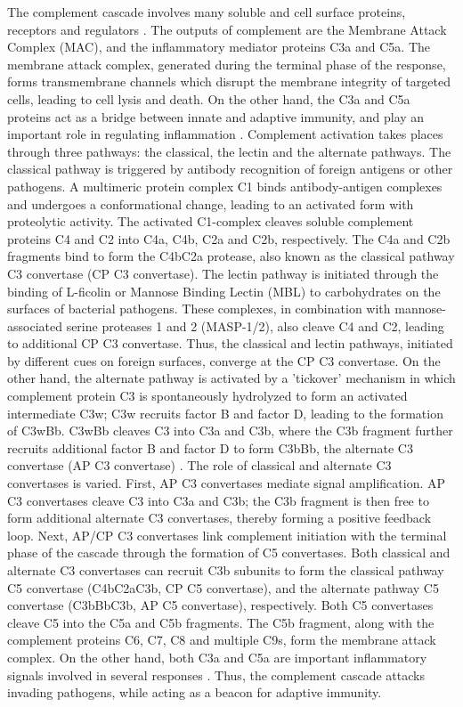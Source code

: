 \documentclass[12pt]{article}
\begin{document}
The complement cascade involves many soluble and cell surface proteins, receptors and regulators \cite{Walport:2001ab,Walport:2001aa}.
The outputs of complement are the Membrane Attack Complex (MAC), and the inflammatory mediator proteins C3a and C5a.
The membrane attack complex, generated during the terminal phase of the response,
forms transmembrane channels which disrupt the membrane integrity of targeted cells, leading to cell lysis and death.
On the other hand, the C3a and C5a proteins act as a bridge between innate and adaptive immunity, and play an important role in regulating inflammation \cite{sarma2011complement}.
Complement activation takes places through three pathways: the classical, the lectin and the alternate pathways.
The classical pathway is triggered by antibody recognition of foreign antigens or other pathogens.
A multimeric protein complex C1 binds antibody-antigen complexes and undergoes a conformational change, leading to an activated form with proteolytic activity.
The activated C1-complex cleaves soluble complement proteins C4 and C2 into C4a, C4b, C2a and C2b, respectively.
The C4a and C2b fragments bind to form the C4bC2a protease, also known as the classical pathway C3 convertase (CP C3 convertase).
The lectin pathway is initiated through the binding of L-ficolin or Mannose Binding Lectin (MBL) to carbohydrates on the surfaces of bacterial pathogens.
These complexes, in combination with mannose-associated serine proteases
1 and 2 (MASP-1/2), also cleave C4 and C2, leading to additional CP C3 convertase.
Thus, the classical and lectin pathways, initiated by different cues on foreign surfaces,  converge at the CP C3 convertase.
On the other hand, the alternate pathway is activated by a 'tickover' mechanism in which complement protein C3 is spontaneously hydrolyzed to form an activated intermediate C3w;
C3w recruits factor B and factor D, leading to the formation of C3wBb. C3wBb cleaves C3 into C3a and C3b, where
the C3b fragment further recruits additional factor B and factor D to form C3bBb, the alternate C3 convertase (AP C3 convertase) \cite{pangburn1984alternative}.
The role of classical and alternate C3 convertases is varied.
First, AP C3 convertases mediate signal amplification.
AP C3 convertases cleave C3 into C3a and C3b; the C3b fragment is then free to form additional alternate C3 convertases,
thereby forming a positive feedback loop.
Next, AP/CP C3 convertases link complement initiation with the terminal phase of the cascade through the formation of C5 convertases.
Both classical and alternate C3 convertases can recruit C3b subunits to form the classical pathway C5 convertase (C4bC2aC3b, CP C5 convertase), and the alternate pathway C5 convertase (C3bBbC3b, AP C5 convertase), respectively. Both C5 convertases cleave C5 into the C5a and C5b fragments.
The C5b fragment, along with the complement proteins C6, C7, C8 and multiple C9s, form the membrane attack complex.
On the other hand, both C3a and C5a are important inflammatory signals involved in several responses \cite{Walport:2001ab,Walport:2001aa}.
Thus, the complement cascade attacks invading pathogens, while acting as a beacon for adaptive immunity.
\end{document}
